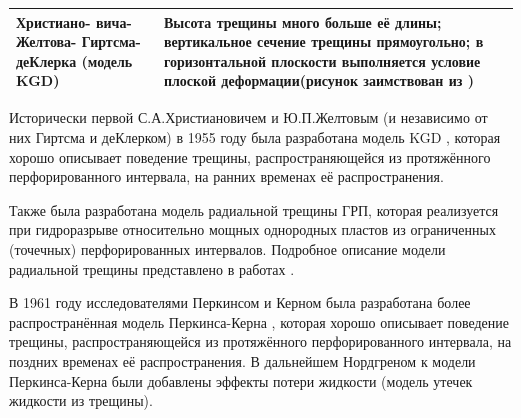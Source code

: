 \begin{longtable}[l]{|L{2.2cm}|m{7.3cm}|L{6.2cm}|}
	Христиано- вича- Желтова- Гиртсма- деКлерка (модель KGD)&Высота трещины много больше её длины; вертикальное сечение трещины прямоугольно; в горизонтальной плоскости выполняется условие плоской деформации\break\hfill\break (рисунок заимствован из \cite{adachi})&\hfill\break{}\hfill\break\\ \hline
	
\end{longtable}
\normalsize%
\endgroup

Исторически первой С.А.Христиановичем и Ю.П.Желтовым (и независимо от них Гиртсма и деКлерком) в 1955 году была разработана модель KGD \cite{khristianovic_zheltov}, которая хорошо описывает поведение трещины, распространяющейся из протяжённого перфорированного интервала, на ранних временах её распространения.

Также была разработана модель радиальной трещины ГРП, которая реализуется при гидроразрыве относительно мощных однородных пластов из ограниченных (точечных) перфорированных интервалов.
Подробное описание модели радиальной трещины представлено в работах \cite{madyarova,savitski}.

В 1961 году исследователями Перкинсом и Керном была разработана более распространённая модель Перкинса-Керна \cite{perkins_kern}, которая хорошо описывает поведение трещины, распространяющейся из протяжённого перфорированного интервала, на поздних временах её распространения.
В дальнейшем Нордгреном \cite{nordgren} к модели Перкинса-Керна были добавлены эффекты потери жидкости (модель утечек жидкости из трещины).

